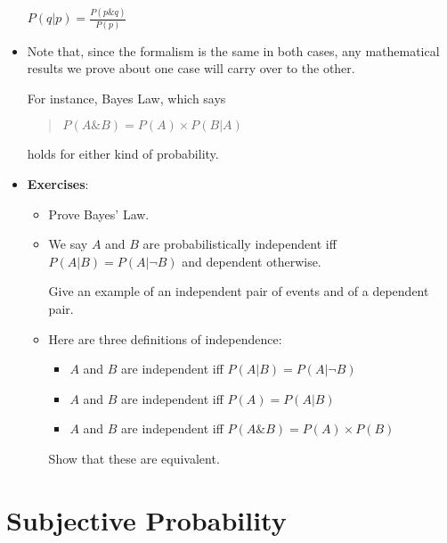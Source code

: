 \documentclass[justified]{tufte-handout}
\begin{document}
\begin{itemize}
$P(q|p)= \frac{P(p \& q)}{P(p)}$



\item Note that, since the formalism is the same in both cases, any mathematical results we prove about one case will carry over to the other. 

For instance, Bayes Law, which says


\begin{quote}

$P(A \& B) = P(A) \times P(B|A)$ 

\end{quote}

holds for either kind of probability.

\item \textbf{Exercises}:

\begin{itemize}


\item Prove Bayes' Law.

\item We say $A$ and $B$ are probabilistically independent iff $P(A|B) = P(A|\neg B)$ and dependent otherwise.

Give an example of an independent pair of events and of a dependent pair.


\item Here are three definitions of independence: 

\begin{itemize}

\item $A$ and $B$ are independent iff $P(A|B) = P(A|\neg B)$

\item  $A$ and $B$ are independent iff $P(A) = P(A|B)$

\item  $A$ and $B$ are independent iff $P(A \&B) = P(A)\times P(B)$

\end{itemize}

Show that these are equivalent.


\end{itemize}




\end{itemize}




\section{Subjective Probability}
\end{document}
